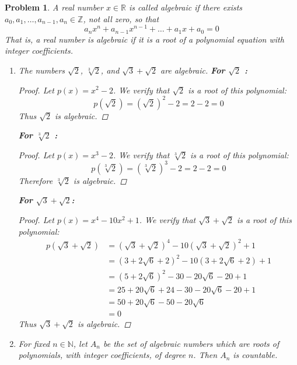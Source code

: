\documentclass[12pt]{article}
\newtheorem{problem}{Problem}
\newcommand{\NN}{\ensuremath{\mathbb N}}
\newcommand{\RR}{\ensuremath{\mathbb R}}
\newcommand{\ZZ}{\ensuremath{\mathbb Z}}
\begin{document}
\renewcommand{\labelenumi}{(\alph{enumi})}

\begin{problem} %
A real number $x\in\RR$ is called \emph{algebraic} if there exists $a_0, a_1, \dots, a_{n-1}, a_n \in \ZZ$, not all zero, so that
	$$a_n x^n + a_{n-1} x^{n-1} + \dots + a_1 x + a_0 = 0$$
That is, a real number is algebraic if it is a root of a polynomial equation with integer coefficients.

\begin{enumerate}
\item The numbers $\sqrt{2}$, $\sqrt[3]{2}$, and $\sqrt{3} + \sqrt{2}$ are algebraic.
\newline \textbf{For $\sqrt{2}$ :} 
\begin{proof}
Let $p(x) = x^2 - 2$. We verify that $\sqrt{2}$ is a root of this polynomial:
	$$p(\sqrt{2}) = (\sqrt{2})^2 - 2 = 2 - 2  = 0$$
	Thus $\sqrt{2}$ is algebraic.
\end{proof}
\textbf{For $\sqrt[3]{2}$ :}
\begin{proof}
	Let $p(x) = x^3 - 2$. We verify that $\sqrt[3]{2}$ is a root of this polynomial:
	$$p(\sqrt[3]{2}) = (\sqrt[3]{2})^3 - 2 = 2 - 2 = 0$$
	Therefore $\sqrt[3]{2}$ is algebraic.
\end{proof}
\textbf{For $\sqrt{3} + \sqrt{2}$:}
\begin{proof}
	Let $p(x) = x^4 - 10x^2 + 1$. We verify that $\sqrt{3} + \sqrt{2}$ is a root of this polynomial:
	\begin{align*}
		p(\sqrt{3} + \sqrt{2}) &= (\sqrt{3}+\sqrt{2})^4 - 10(\sqrt{3} + \sqrt{2})^2 + 1 \\
													 &= (3 + 2\sqrt{6} + 2)^2 - 10(3 + 2\sqrt{6} + 2) + 1 \\
													 &= (5 + 2\sqrt{6})^2 - 30 - 20\sqrt{6} - 20 + 1 \\
													 &= 25 + 20\sqrt{6} + 24 - 30 - 20\sqrt{6} - 20 + 1 \\
													 &= 50 + 20\sqrt{6} - 50 - 20\sqrt{6} \\
													 &= 0
	\end{align*}
	Thus $\sqrt{3} + \sqrt{2}$ is algebraic.
\end{proof}

\item For fixed $n\in\NN$, let $A_n$ be the set of algebraic numbers which are roots of polynomials, with integer coefficients, of degree $n$.  Then $A_n$ is countable.


\end{enumerate}
\end{problem}
\end{document}
